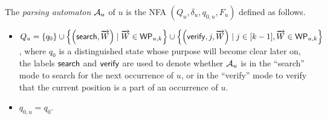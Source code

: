 \begin{definition}
The \emph{parsing automaton} $\mathcal{A}_u$ of $u$ is the NFA $(Q_u, \delta_u, q_{0,u}, F_u)$ defined as follows. 
\begin{itemize}
	\item  $Q_u =\left\{q_0 \right\} \cup \left\{ \left(\mathsf{search}, \overrightarrow{W} \right) \mid \overrightarrow{W} \in \mathsf{WP}_{u, k} \right\} \cup  \left\{ \left(\mathsf{verify}, j, \overrightarrow{W} \right) \mid j \in [k-1], \overrightarrow{W} \in \mathsf{WP}_{u,k} \right\}$, where $q_0$ is a distinguished state whose purpose will become clear later on,  the labels $\mathsf{search}$ and $\mathsf{verify}$ are used to denote whether $\mathcal{A}_u$ is in the ``search'' mode to search for the next occurrence of $u$, or in the ``verify'' mode to verify that the current position is a part of an occurrence of $u$.
	\item $q_{0,u}=q_0$.
	

\end{itemize}
\end{definition}
